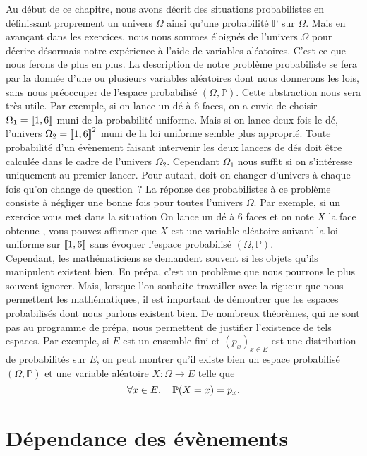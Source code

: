 \documentclass{magnolia}
\begin{document}
Au début de ce chapitre, nous avons décrit des situations probabilistes en définissant
proprement un univers $\Omega$ ainsi qu'une probabilité $\mathbb{P}$ sur $\Omega$.
Mais en avançant dans les exercices, nous nous sommes éloignés
de l'univers $\Omega$ pour décrire désormais notre expérience à l'aide de variables aléatoires.
C'est ce que nous ferons de plus en plus. La description de notre problème probabiliste
se fera par la donnée d'une ou plusieurs variables aléatoires dont nous donnerons les
lois, sans nous préoccuper de l'espace probabilisé $(\Omega,\mathbb{P})$. Cette
abstraction nous sera très utile. Par exemple, si on lance un dé à 6 faces, on a envie
de choisir $\Omega_1=\left\llbracket 1,6\right\rrbracket$ muni de la probabilité uniforme. Mais si on lance
deux fois le dé, l'univers $\Omega_2=\left\llbracket 1,6\right\rrbracket^2$ muni de la loi uniforme semble
plus approprié. Toute probabilité d'un évènement faisant intervenir les deux lancers de
dés doit être calculée dans le cadre de l'univers $\Omega_2$. Cependant $\Omega_1$ nous suffit
si on s'intéresse uniquement au premier lancer. Pour autant, doit-on changer d'univers à chaque fois
qu'on change de question~? La réponse des probabilistes à ce problème consiste à négliger
une bonne fois pour toutes l'univers $\Omega$. Par exemple, si un exercice vous met dans la
situation \og On lance un dé à 6 faces et on note $X$ la face obtenue \fg, vous pouvez
affirmer que $X$ est une variable aléatoire suivant la loi uniforme sur $\left\llbracket 1,6\right\rrbracket$
sans évoquer l'espace probabilisé $(\Omega,\mathbb{P})$.\\

Cependant, les mathématiciens se demandent souvent si les objets qu'ils manipulent existent bien.
En prépa, c'est un problème que nous pourrons le plus souvent ignorer. Mais, lorsque l'on souhaite
travailler avec la rigueur que nous permettent les mathématiques, il est important de démontrer que
les espaces probabilisés dont nous parlons existent bien. De nombreux théorèmes, qui ne sont pas
au programme de prépa, nous permettent de
justifier l'existence de tels espaces. Par exemple, si $E$ est un ensemble fini et $(p_x)_{x\in E}$ est
une distribution de probabilités sur $E$, on peut montrer qu'il existe bien un espace probabilisé
$(\Omega,\mathbb{P})$ et une variable aléatoire $X:\Omega\to E$ telle que
\[\forall x\in E,\quad \mathbb{P}(X=x)=p_x.\]

\section{Dépendance des évènements}
\end{document}
